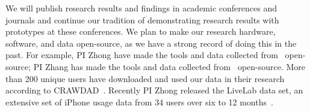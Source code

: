 We will publish research results and findings in academic conferences and journals and continue our tradition of demonstrating research results with prototypes at these conferences.
We plan to make our research hardware, software, and data open-source, as we have a strong record of doing this in the past. For example, PI Zhong have made the tools and data collected from~\cite{rahmati2007mobisys,liu2009percom,amirisani2010mobicom,shepard2010hotmetrics,wang2012www} open-source; PI Zhang has made the tools and data collected from~\cite{***} open-source.  More than 200 unique users have downloaded and used our data in their research according to CRAWDAD~\cite{crawdad}. Recently PI Zhong released the LiveLab data set, an extensive set of iPhone usage data from 34 users over six to 12 months~\cite{recgdownload}.
